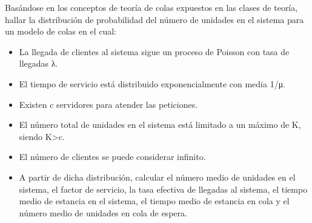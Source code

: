 \begin{problem}[14]
Basándose en los conceptos de teoría de colas expuestos en las clases de teoría, hallar la distribución de probabilidad del número de unidades en el sistema para un modelo de colas en el cual:
\begin{itemize}
\item La llegada de clientes al sistema sigue un proceso de Poisson con tasa de llegadas λ.
\item El tiempo de servicio está distribuido exponencialmente con media 1/μ.
\item Existen c servidores para atender las peticiones.
\item El número total de unidades en el sistema está limitado a un máximo de K, siendo K>c.
\item El número de clientes se puede considerar infinito.
\item A partir de dicha distribución, calcular el número medio de unidades en el sistema, el factor de servicio, la tasa efectiva de llegadas al sistema, el tiempo medio de estancia en el sistema, el tiempo medio de estancia en cola y el número medio de unidades en cola de espera.
\end{itemize}
\solution

%
%
%
%
%

\end{problem}

